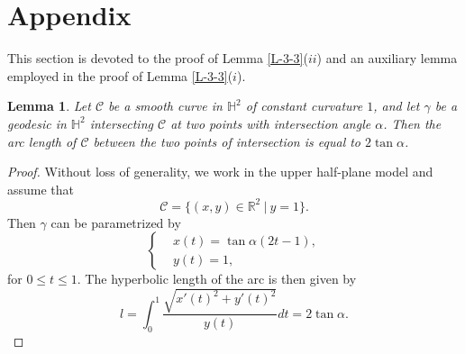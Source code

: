 \documentclass[11pt,leqno]{article}
\numberwithin{equation}{section}
\newtheorem{lemma}[theorem]{Lemma}
\theoremstyle{definition}
\begin{document}
\section{Appendix}
This section is devoted to the proof of Lemma \ref{L-3-3}($ii$) and an auxiliary lemma employed in the proof of  Lemma \ref{L-3-3}($i$).
\begin{lemma}\label{L-6-1}
Let $\mathcal{C}$ be a smooth curve in $\mathbb{H}^2$ of constant curvature $1$, and let $\gamma$ be a geodesic in $\mathbb{H}^2$ intersecting $\mathcal{C}$ at two points with intersection angle $\alpha$. Then the arc length of $\mathcal{C}$ between the two points of intersection is equal to $2\tan\alpha$.
\end{lemma}

\begin{proof}
Without loss of generality, we work in the upper half-plane model and assume that
\[\mathcal C=\{(x,y)\in\mathbb{R}^2\ |\ y=1\}.\]
Then $\gamma$ can be parametrized by
\[
\left\{
\begin{aligned}
&x(t)=\tan\alpha(2t-1),\\
&y(t)=1,
\end{aligned}
\right.
\]
for $0\leq t\leq 1$. The hyperbolic length of the arc is then given by
\[l=\int_0^1\frac{\sqrt{x'(t)^2+y'(t)^2}}{y(t)}dt=2\tan\alpha.\]
\end{proof}
\end{document}
